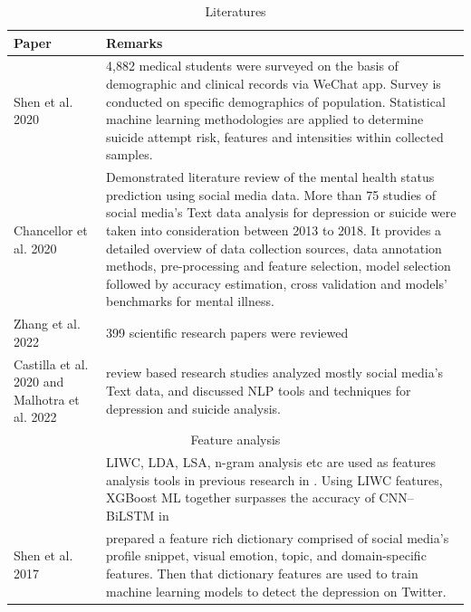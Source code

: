 \documentclass[sn-mathphys,Numbered]{sn-jnl}%
\theoremstyle{thmstyleone}%
\theoremstyle{thmstyletwo}%
\theoremstyle{thmstylethree}%
\begin{document}
\begin{table}[h!]
\begin{center}
\begin{flushleft}
\caption{Literatures}\label{chord_inference}%
\begin{tabular}{|p{2cm}|p{10cm}|}
\toprule
\textbf{Paper} & \textbf{Remarks} \\
\midrule
\cite{shen2020detecting} Shen et al. 2020 & 4,882 medical students were surveyed on the basis of demographic and clinical records via WeChat app. Survey is conducted on specific demographics of population. Statistical machine learning methodologies are applied to determine suicide attempt risk, features and intensities within collected samples.  \\

\cite{chancellor2020methods} Chancellor et al. 2020 & Demonstrated literature review of the mental health status prediction using social media data. More than 75 studies of social media's Text data analysis for depression or suicide were taken into consideration between 2013 to 2018. It provides a detailed overview of data collection sources, data annotation methods, pre-processing and feature selection, model selection followed by accuracy estimation, cross validation and models’ benchmarks for mental illness. \\

\cite{zhang2022natural}  Zhang et al. 2022 & 399 scientific research papers were reviewed \\
\cite{castillo2020suicide} Castilla et al. 2020  and \cite{malhotra2022deep} Malhotra et al. 2022  & review based research studies analyzed mostly social media's Text data, and discussed NLP tools and techniques for depression and suicide analysis. \\ 
\multicolumn{2}{c}{Feature analysis}\\
 \cite{pennebaker2001linguistic, tadesse2019detection} & LIWC, LDA, LSA, n-gram analysis etc are used as features analysis tools in previous research in \cite{pennebaker2001linguistic, tadesse2019detection}. Using LIWC features, XGBoost ML together surpasses the accuracy of CNN–BiLSTM in \cite{aldhyani2022detecting} \\
Shen et al. 2017 \cite{shen2017depression} & prepared a feature rich dictionary comprised of social media's profile snippet, visual emotion, topic, and domain-specific features. Then that dictionary features are used to train machine learning models to detect the depression on Twitter. \\
 

\end{tabular}
\end{flushleft}
\end{center}
\end{table}
\end{document}
